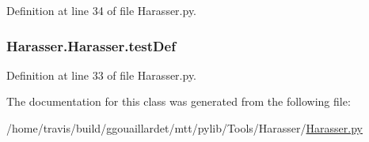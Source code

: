 Definition at line 34 of file Harasser.\-py.

\hypertarget{classHarasser_1_1Harasser_adddf34aabbc91934437e1a30134224c3}{
\subsubsection[{test\-Def}]{\setlength{\rightskip}{0pt plus 5cm}Harasser.\-Harasser.\-test\-Def}}\label{classHarasser_1_1Harasser_adddf34aabbc91934437e1a30134224c3}


Definition at line 33 of file Harasser.\-py.



The documentation for this class was generated from the following file\-:\begin{DoxyCompactItemize}
\item 
/home/travis/build/ggouaillardet/mtt/pylib/\-Tools/\-Harasser/\hyperlink{Harasser_8py}{Harasser.\-py}\end{DoxyCompactItemize}

